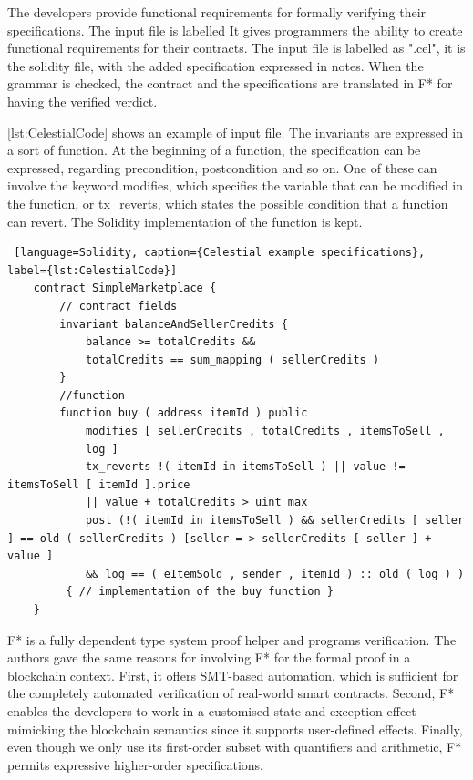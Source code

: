The developers provide functional requirements for formally verifying their specifications. The input file is labelled 
It gives programmers the ability to create functional requirements for their contracts. 
The input file is labelled as ".cel", it is the solidity file, with the added specification expressed in notes. 
When the grammar is checked, the contract and the specifications are translated in F* for having the verified verdict. 

\autoref*{lst:CelestialCode} shows an example of input file. The invariants are expressed in a sort of function. 
At the beginning of a function, the specification can be expressed, regarding precondition, postcondition and so on. 
One of these can involve the keyword modifies, which specifies the variable that can be modified in the function, or tx\_reverts, 
which states the possible condition that a function can revert. 
The Solidity implementation of the function is kept.
\begin{lstlisting} [language=Solidity, caption={Celestial example specifications}, label={lst:CelestialCode}]
    contract SimpleMarketplace {
        // contract fields
        invariant balanceAndSellerCredits {
            balance >= totalCredits &&
            totalCredits == sum_mapping ( sellerCredits )
        }
        //function 
        function buy ( address itemId ) public
            modifies [ sellerCredits , totalCredits , itemsToSell ,
            log ]
            tx_reverts !( itemId in itemsToSell ) || value != itemsToSell [ itemId ].price
            || value + totalCredits > uint_max
            post (!( itemId in itemsToSell ) && sellerCredits [ seller ] == old ( sellerCredits ) [seller = > sellerCredits [ seller ] + value ]
            && log == ( eItemSold , sender , itemId ) :: old ( log ) )
         { // implementation of the buy function }
    }
\end{lstlisting}

F* is a fully dependent type system proof helper and programs verification. 
The authors gave the same reasons for involving F* for the formal proof in a blockchain context.
First, it offers SMT-based automation, which is sufficient for the completely automated verification of real-world smart contracts. 
Second, F* enables the developers to work in a customised state and exception effect mimicking the blockchain semantics since it supports user-defined effects. 
Finally, even though we only use its first-order subset with quantifiers and arithmetic, F* permits expressive higher-order specifications.

